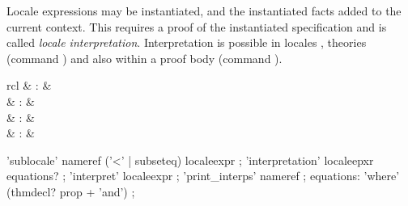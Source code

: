 \begin{isabellebody}
\begin{isamarkuptext}
\begin{description}
  \end{description}%
\end{isamarkuptext}%
\isamarkuptrue%
%
\isamarkuptrue%
%
\begin{isamarkuptext}%
Locale expressions may be instantiated, and the instantiated facts
  added to the current context.  This requires a proof of the
  instantiated specification and is called \emph{locale
  interpretation}.  Interpretation is possible in locales \hyperlink{command.sublocale}{\mbox{}}, theories (command \hyperlink{command.interpretation}{\mbox{}}) and
  also within a proof body (command \hyperlink{command.interpret}{\mbox{}}).

  \begin{matharray}{rcl}
    \hypertarget{command.sublocale}{\hyperlink{command.sublocale}{\mbox{}}} & : &  \\
    \hypertarget{command.interpretation}{\hyperlink{command.interpretation}{\mbox{}}} & : &  \\
    \hypertarget{command.interpret}{\hyperlink{command.interpret}{\mbox{}}} & : &  \\
    \hypertarget{command.print-interps}{\hyperlink{command.print-interps}{\mbox{}}}\isa{{\isachardoublequote}\isactrlsup {\isacharasterisk}{\isachardoublequote}} & : &  \\
  \end{matharray}

  \begin{rail}
    'sublocale' nameref ('<' | subseteq) localeexpr
    ;
    'interpretation' localeepxr equations?
    ;
    'interpret' localeexpr
    ;
    'print\_interps' nameref
    ;
    equations: 'where' (thmdecl? prop + 'and')
    ;
  \end{rail}


\end{isamarkuptext}
\end{isabellebody}
